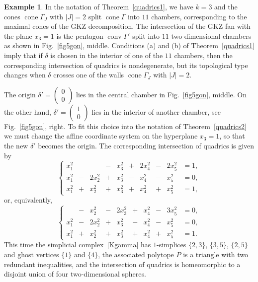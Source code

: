 \documentclass[a4paper]{amsart}
\theoremstyle{definition}
\newtheorem{example}[theorem]{Example}
\theoremstyle{remark}
\numberwithin{equation}{section}
\def\cone{\mathop{\mathrm{cone}}}
\def\conv{\mathop{\mathrm{conv}}}
\newcommand{\<}{\langle}
\renewcommand{\>}{\rangle}
\begin{document}
\begin{example}
In the notation of Theorem~\ref{quadrics1}, we have $k=3$ and the cones 
$\cone\Gamma_J$ with $|J|=2$ split $\cone\Gamma$ into $11$ chambers, corresponding to the maximal cones of the GKZ decomposition. The intersection of the GKZ fan with the plane $x_3=1$ is the pentagon $\conv\Gamma'$ split into $11$ two-dimensional chambers as shown in Fig.~\ref{fig5gon}, middle. Conditions (a) and (b) of Theorem~\ref{quadrics1} imply that if $\delta$ is chosen in the interior of one of the $11$ chambers, then the corresponding intersection of quadrics is nondegenerate, but its topological type changes when $\delta$ crosses one of the walls $\cone\Gamma_J$ with $|J|=2$.

The origin $\delta'=\begin{pmatrix}0\\0\end{pmatrix}$ lies in the central chamber in Fig.~\ref{fig5gon}, middle. On the other hand, $\delta'=\begin{pmatrix}1\\0\end{pmatrix}$ lies in the interior of another chamber, see Fig.~\ref{fig5gon}, right. To fit this choice into the notation of Theorem~\ref{quadrics2} we must change the affine coordinate system on the hyperplane $x_3=1$, so that the new $\delta'$ becomes the origin. The corresponding intersection of quadrics is given by
\[
  \left\{\begin{array}{cccccccccc}
  x_1^2&&&-&x_3^2&+&2x_4^2&-&2x_5^2&=1,\\[2pt]
  x_1^2&-&2x_2^2&+&x_3^2&-&x_4^2&-&x_5^2&=0,\\[2pt]
  x_1^2&+&x_2^2&+&x_3^2&+&x_4^2&+&x_5^2&=1,
  \end{array}\right.
\]
or, equivalently,
\[
  \left\{\begin{array}{cccccccccc}
  &-&x_2^2&-&2x_3^2&+&x_4^2&-&3x_5^2&=0,\\[2pt]
  x_1^2&-&2x_2^2&+&x_3^2&-&x_4^2&-&x_5^2&=0,\\[2pt]
  x_1^2&+&x_2^2&+&x_3^2&+&x_4^2&+&x_5^2&=1.
  \end{array}\right.
\]
This time the simplicial complex~\eqref{Kgamma} has $1$-simplices $\{2,3\}$, 
$\{3,5\}$, $\{2,5\}$ and ghost vertices $\{1\}$ and $\{4\}$, the associated polytope $P$ is a triangle with two redundant inequalities, and the intersection of quadrics is homeomorphic to a disjoint union of four two-dimensional spheres.
\end{example}
\end{document}
